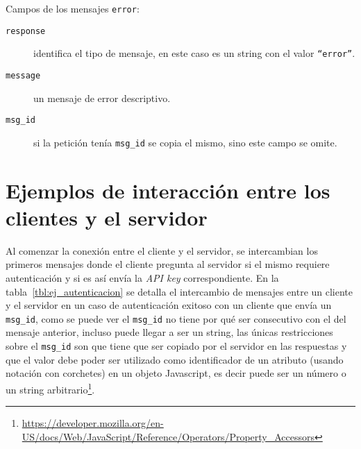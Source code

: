 Campos de los mensajes \texttt{error}:
\begin{description}
    \item[\texttt{response}] identifica el tipo de mensaje, en este caso
        es un string con el valor \texttt{``error''}.
    \item[\texttt{message}] un mensaje de error descriptivo.
    \item[\texttt{msg\_id}] si la petición tenía \texttt{msg\_id} se
        copia el mismo, sino este campo se omite.
\end{description}


\section{Ejemplos de interacción entre los clientes y el servidor}

Al comenzar la conexión entre el cliente y el servidor, se intercambian
los primeros mensajes donde el cliente pregunta al servidor si el
mismo requiere autenticación y si es así envía la \textit{API key}
correspondiente. En la tabla~\ref{tbl:ej_autenticacion} se detalla
el intercambio de mensajes entre un cliente y el servidor en un
caso de autenticación exitoso con un cliente que envía un \texttt{msg\_id},
como se puede ver el \texttt{msg\_id}
no tiene por qué ser consecutivo con el del mensaje anterior, incluso
puede llegar a ser un string, las únicas restricciones sobre el
\texttt{msg\_id} son que tiene que ser copiado por el servidor
en las respuestas y que el valor debe poder ser utilizado como
identificador de un atributo (usando notación con corchetes) en un
objeto Javascript, es decir puede ser un número o un string
arbitrario\footnote{\url{https://developer.mozilla.org/en-US/docs/Web/JavaScript/Reference/Operators/Property\_Accessors}}.

